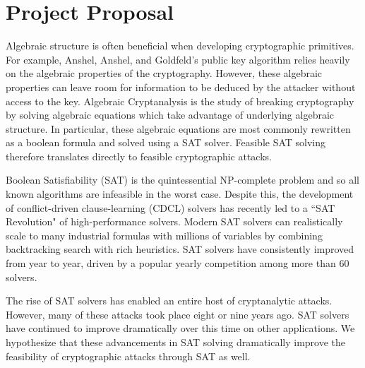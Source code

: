 \section{Project Proposal}

Algebraic structure is often beneficial when developing cryptographic primitives. For example, Anshel, Anshel, and Goldfeld's public key algorithm \cite{AAG99} relies heavily on the algebraic properties of the cryptography. However, these algebraic properties can leave room for information to be deduced by the attacker without access to the key. Algebraic Cryptanalysis \cite{Bard09} is the study of breaking cryptography by solving algebraic equations which take advantage of underlying algebraic structure. In particular, these algebraic equations are most commonly rewritten as a boolean formula and solved using a SAT solver. Feasible SAT solving therefore translates directly to feasible cryptographic attacks.

Boolean Satisfiability (SAT) is the quintessential NP-complete problem and so all known algorithms are infeasible in the worst case. Despite this, the development of conflict-driven clause-learning (CDCL) solvers has recently led to a ``SAT Revolution" of high-performance solvers. \cite{BHMW09} Modern SAT solvers can realistically scale to many industrial formulas with millions of variables by combining backtracking search with rich heuristics. \cite{MZ09} SAT solvers have consistently improved from year to year, driven by a popular yearly competition among more than 60 solvers. \cite{JLRS12}

The rise of SAT solvers has enabled an entire host of cryptanalytic attacks. However, many of these attacks took place  \cite{CB07,CNO08,DKV07,MCP07,MZ06} eight or nine years ago. SAT solvers have continued to improve dramatically over this time on other applications. We hypothesize that these advancements in SAT solving dramatically improve the feasibility of cryptographic attacks through SAT as well.

